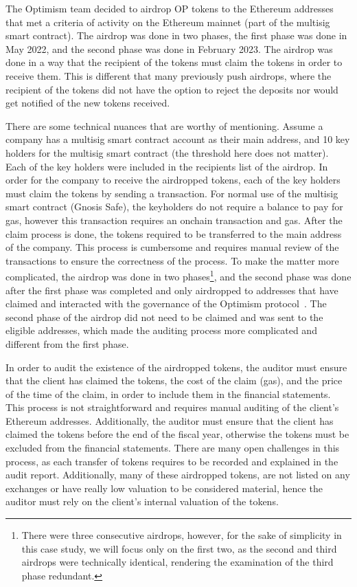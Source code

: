 The Optimism team decided to airdrop OP tokens to the Ethereum addresses that met a criteria of activity on the Ethereum mainnet (\eg part of the multisig smart contract). The airdrop was done in two phases, the first phase was done in May 2022, and the second phase was done in February 2023. The airdrop was done in a way that the recipient of the tokens must claim the tokens in order to receive them. This is different that many previously push airdrops, where the recipient of the tokens did not have the option to reject the deposits nor would get notified of the new tokens received. 

There are some technical nuances that are worthy of mentioning. Assume a company has a multisig smart contract account as their main address, and 10 key holders for the multisig smart contract (the threshold here does not matter). Each of the key holders were included in the recipients list of the airdrop. In order for the company to receive the airdropped tokens, each of the key holders must claim the tokens by sending a transaction. For normal use of the multisig smart contract (\eg Gnosis Safe), the keyholders do not require a balance to pay for gas, however this transaction requires an onchain transaction and gas. After the claim process is done, the tokens required to be transferred to the main address of the company. This process is cumbersome and requires manual review of the transactions to ensure the correctness of the process. To make the matter more complicated, the airdrop was done in two phases\footnote{There were three consecutive airdrops, however, for the sake of simplicity in this case study, we will focus only on the first two, as the second and third airdrops were technically identical, rendering the examination of the third phase redundant.}, and the second phase was done after the first phase was completed and only airdropped to addresses that have claimed and interacted with the governance of the Optimism protocol~\cite{allen2023airdrop}. The second phase of the airdrop did not need to be claimed and was sent to the eligible addresses, which made the auditing process more complicated and different from the first phase. 

In order to audit the existence of the airdropped tokens, the auditor must ensure that the client has claimed the tokens, the cost of the claim (gas), and the price of the time of the claim, in order to include them in the financial statements. This process is not straightforward and requires manual auditing of the client's Ethereum addresses. Additionally, the auditor must ensure that the client has claimed the tokens before the end of the fiscal year, otherwise the tokens must be excluded from the financial statements. There are many open challenges in this process, as each transfer of tokens requires to be recorded and explained in the audit report. Additionally, many of these airdropped tokens, are not listed on any exchanges or have really low valuation to be considered material, hence the auditor must rely on the client's internal valuation of the tokens.


